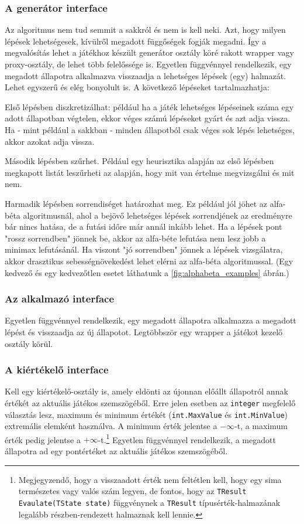 \documentclass[twoside, a4paper, 12pt]{book}
\begin{document}
\subsubsection{A generátor interface} Az algoritmus nem tud semmit a sakkról és nem is kell neki. Azt, hogy milyen lépések lehetségesek, kívülről megadott függőségek fogják megadni. Így a megvalósítás lehet a játékhoz készült generátor osztály köré rakott wrapper vagy proxy-osztály, de lehet több felelőssége is. Egyetlen függvénnyel rendelkezik, egy megadott állapotra alkalmazva visszaadja a lehetséges lépések (egy) halmazát. Lehet egyszerű és elég bonyolult is. A következő lépéseket tartalmazhatja:

Első lépésben diszkretizálhat: például ha a játék lehetséges lépéseinek száma egy adott állapotban végtelen, ekkor véges számú lépéseket gyárt és azt adja vissza. Ha - mint például a sakkban - minden állapotból csak véges sok lépés lehetséges, akkor azokat adja vissza.

Második lépésben szűrhet. Például egy heurisztika alapján az első lépésben megkapott listát leszűrheti az alapján, hogy mit van értelme megvizsgálni és mit nem.

Harmadik lépésben sorrendiséget határozhat meg. Ez például jól jöhet az alfa-béta algoritmusnál, ahol a bejövő lehetséges lépések sorrendjének az eredményre bár nincs hatása, de a futási időre már annál inkább lehet. Ha a lépések pont "rossz sorrendben" jönnek be, akkor az alfa-béte lefutása nem lesz jobb a minimax lefutásánál. Ha viszont "jó sorrendben" jönnek a lépések vizsgálatra, akkor drasztikus sebességnövekedést lehet elérni az alfa-béta algoritmussal. (Egy kedvező és egy kedvezőtlen esetet láthatunk a \ref{fig:alphabeta_examples} ábrán.)

\subsubsection{Az alkalmazó interface} Egyetlen függvénnyel rendelkezik, egy megadott állapotra alkalmazza a megadott lépést és visszaadja az új állapotot. Legtöbbször egy wrapper a játékot kezelő osztály körül.

\subsubsection{A kiértékelő interface}
Kell egy kiértékelő-osztály is, amely eldönti az újonnan előállt állapotról annak értékét az aktuális játékos szemszögéből. Erre jelen esetben az \texttt{integer} megfelelő választás lesz, maximum és minimum értékét (\texttt{int.MaxValue} és \texttt{int.MinValue}) extremális elemként használva. A minimum érték jelentse a $-\infty$-t, a maximum érték pedig jelentse a $+\infty$-t.\footnote{Megjegyzendő, hogy a visszaadott érték nem feltétlen kell, hogy egy sima természetes vagy valós szám legyen, de fontos, hogy az \texttt{TResult Evaulate(TState state)} függvénynek a \texttt{TResult} típusérték-halmazának legalább részben-rendezett halmaznak kell lennie.}
Egyetlen függvénnyel rendelkezik, a megadott állapotra ad egy pontértéket az aktuális játékos szemszögéből.
\end{document}
